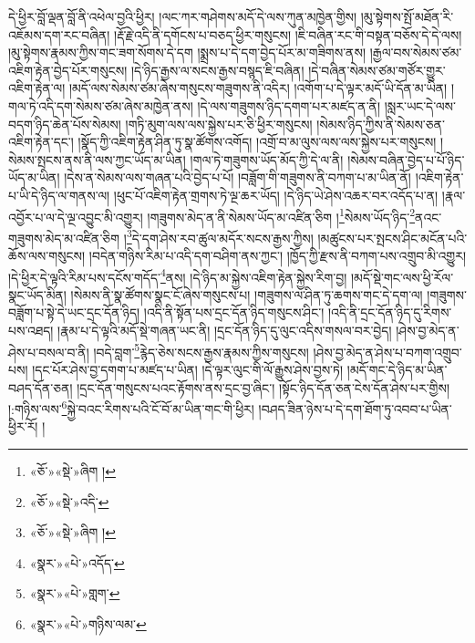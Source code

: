 དེ་ཕྱིར་བློ་ལྡན་བློ་ནི་འཕེལ་བྱའི་ཕྱིར། །ལང་ཀར་གཤེགས་མདོ་དེ་ལས་ཀུན་མཁྱེན་གྱིས། །མུ་སྟེགས་སྤོ་མཐོན་རི་འཇོམས་དག་རང་བཞིན། །རྡོ་རྗེ་འདི་ནི་དགོངས་པ་བཅད་ཕྱིར་གསུངས། །ཇི་བཞིན་རང་གི་བསྟན་བཅོས་དེ་དེ་ལས། །མུ་སྟེགས་རྣམས་ཀྱིས་གང་ཟག་སོགས་དེ་དག །སྨྲས་པ་དེ་དག་བྱེད་པོར་མ་གཟིགས་ནས། །རྒྱལ་བས་སེམས་ཙམ་འཇིག་རྟེན་བྱེད་པོར་གསུངས། །དེ་ཉིད་རྒྱས་ལ་སངས་རྒྱས་བསྙད་ཇི་བཞིན། །དེ་བཞིན་སེམས་ཙམ་གཙོར་གྱུར་འཇིག་རྟེན་ལ། །མདོ་ལས་སེམས་ཙམ་ཞེས་གསུངས་གཟུགས་ནི་འདིར། །འགོག་པ་དེ་ལྟར་མདོ་ཡི་དོན་མ་ཡིན། །གལ་ཏེ་འདི་དག་སེམས་ཙམ་ཞེས་མཁྱེན་ནས། །དེ་ལས་གཟུགས་ཉིད་དགག་པར་མཛད་ན་ནི། །སླར་ཡང་དེ་ལས་བདག་ཉིད་ཆེན་པོས་སེམས། །གཏི་མུག་ལས་ལས་སྐྱེས་པར་ཅི་ཕྱིར་གསུངས། །སེམས་ཉིད་ཀྱིས་ནི་སེམས་ཅན་འཇིག་རྟེན་དང་། །སྣོད་ཀྱི་འཇིག་རྟེན་ཤིན་ཏུ་སྣ་ཚོགས་འགོད། །འགྲོ་བ་མ་ལུས་ལས་ལས་སྐྱེས་པར་གསུངས། །སེམས་སྤངས་ནས་ནི་ལས་ཀྱང་ཡོད་མ་ཡིན། །གལ་ཏེ་གཟུགས་ཡོད་མོད་ཀྱི་དེ་ལ་ནི། །སེམས་བཞིན་བྱེད་པ་པོ་ཉིད་ཡོད་མ་ཡིན། །དེས་ན་སེམས་ལས་གཞན་པའི་བྱེད་པ་པོ། །བཟློག་གི་གཟུགས་ནི་བཀག་པ་མ་ཡིན་ནོ། །འཇིག་རྟེན་པ་ཡི་དེ་ཉིད་ལ་གནས་ལ། །ཕུང་པོ་འཇིག་རྟེན་གྲགས་ཏེ་ལྔ་ཆར་ཡོད། །དེ་ཉིད་ཡེ་ཤེས་འཆར་བར་འདོད་པ་ན། །རྣལ་འབྱོར་པ་ལ་དེ་ལྔ་འབྱུང་མི་འགྱུར། །གཟུགས་མེད་ན་ནི་སེམས་ཡོད་མ་འཛིན་ཅིག །\footnote{«ཅོ་»«སྡེ་»ཞིག །}སེམས་ཡོད་ཉིད་\footnote{«ཅོ་»«སྡེ་»འདི་}ནའང་གཟུགས་མེད་མ་འཛིན་ཅིག །\footnote{«ཅོ་»«སྡེ་»ཞིག །}དེ་དག་ཤེས་རབ་ཚུལ་མདོར་སངས་རྒྱས་ཀྱིས། །མཚུངས་པར་སྤངས་ཤིང་མངོན་པའི་ཆོས་ལས་གསུངས། །བདེན་གཉིས་རིམ་པ་འདི་དག་བཤིག་ནས་ཀྱང་། །ཁྱོད་ཀྱི་རྫས་ནི་བཀག་པས་འགྲུབ་མི་འགྱུར། །དེ་ཕྱིར་དེ་ལྟའི་རིམ་པས་དངོས་གདོད་\footnote{«སྣར་»«པེ་»འདོད་}ནས། །དེ་ཉིད་མ་སྐྱེས་འཇིག་རྟེན་སྐྱེས་རིག་བྱ། །མདོ་སྡེ་གང་ལས་ཕྱི་རོལ་སྣང་ཡོད་མིན། །སེམས་ནི་སྣ་ཚོགས་སྣང་ངོ་ཞེས་གསུངས་པ། །གཟུགས་ལ་ཤིན་ཏུ་ཆགས་གང་དེ་དག་ལ། །གཟུགས་བཟློག་པ་སྟེ་དེ་ཡང་དྲང་དོན་ཉིད། །འདི་ནི་སྟོན་པས་དྲང་དོན་ཉིད་གསུངས་ཤིང་། །འདི་ནི་དྲང་དོན་ཉིད་དུ་རིགས་པས་འཐད། །རྣམ་པ་དེ་ལྟའི་མདོ་སྡེ་གཞན་ཡང་ནི། །དྲང་དོན་ཉིད་དུ་ལུང་འདིས་གསལ་བར་བྱེད། །ཤེས་བྱ་མེད་ན་ཤེས་པ་བསལ་བ་ནི། །བདེ་བླག་\footnote{«སྣར་»«པེ་»གླག་}རྙེད་ཅེས་སངས་རྒྱས་རྣམས་ཀྱིས་གསུངས། །ཤེས་བྱ་མེད་ན་ཤེས་པ་བཀག་འགྲུབ་པས། །དང་པོར་ཤེས་བྱ་དགག་པ་མཛད་པ་ཡིན། །དེ་ལྟར་ལུང་གི་ལོ་རྒྱུས་ཤེས་བྱས་ཏེ། །མདོ་གང་དེ་ཉིད་མ་ཡིན་བཤད་དོན་ཅན། །དྲང་དོན་གསུངས་པའང་རྟོགས་ནས་དྲང་བྱ་ཞིང་། །སྟོང་ཉིད་དོན་ཅན་ངེས་དོན་ཤེས་པར་གྱིས། །:གཉིས་ལས་\footnote{«སྣར་»«པེ་»གཉིས་ལམ་}སྐྱེ་བའང་རིགས་པའི་ངོ་བོ་མ་ཡིན་གང་གི་ཕྱིར། །བཤད་ཟིན་ཉེས་པ་དེ་དག་ཐོག་ཏུ་འབབ་པ་ཡིན་ཕྱིར་རོ། །
